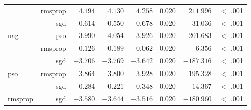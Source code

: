 \begin{table}[htbp]
{\begin{tabular}{lrrrrrrr}
                                       & rmsprop              & $4.194$              & $4.130$                                         & $4.258$              & $0.020$              & $211.996$            & $<$ .001    \\
                                       & sgd                  & $0.614$              & $0.550$                                         & $0.678$              & $0.020$              & $31.036$             & $<$ .001    \\
                  nag                  & pso                  & $-3.990$             & $-4.054$                                        & $-3.926$             & $0.020$              & $-201.683$           & $<$ .001    \\
                  $ $                  & rmsprop              & $-0.126$             & $-0.189$                                        & $-0.062$             & $0.020$              & $-6.356$             & $<$ .001    \\
                                       & sgd                  & $-3.706$             & $-3.769$                                        & $-3.642$             & $0.020$              & $-187.316$           & $<$ .001    \\
                  pso                  & rmsprop              & $3.864$              & $3.800$                                         & $3.928$              & $0.020$              & $195.328$            & $<$ .001    \\
                  $ $                  & sgd                  & $0.284$              & $0.221$                                         & $0.348$              & $0.020$              & $14.367$             & $<$ .001    \\
                  rmsprop              & sgd                  & $-3.580$             & $-3.644$                                        & $-3.516$             & $0.020$              & $-180.960$           & $<$ .001    \\
                  \bottomrule
            \end{tabular}
      }
\end{table}

